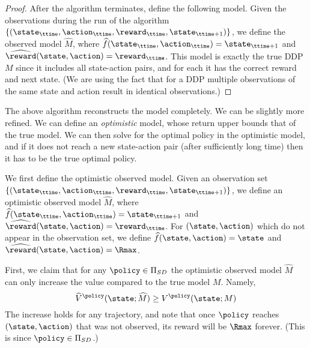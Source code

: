 \begin{proof}
After the algorithm terminates, define the following model. Given
the observations during the run of the algorithm
$\{(\state_\ttime,\action_\ttime ,\reward_\ttime,
\state_{\ttime+1})\}$, we define the observed model $\widehat{M}$,
where $\widehat{f}(\state_\ttime,\action_\ttime)=\state_{\ttime+1}$
and $\widehat{\reward}(\state,\action)=\reward_\ttime$. This model
is exactly the true DDP $M$ since it includes all state-action
pairs, and for each it has the correct reward and next state. (We
are using the fact that for a DDP multiple observations of the same
state and action result in identical observations.)
\end{proof}

The above algorithm reconstructs the model completely. We can be
slightly more refined. We can define an {\em optimistic} model, whose
return upper bounds that of the true model. We can then solve for
the optimal policy in the optimistic model, and if it does not reach a new state-action pair (after sufficiently long time) then it
has to be the true optimal policy.

We first define the optimistic observed model. Given an observation
set $\{(\state_\ttime,\action_\ttime ,\reward_\ttime,
\state_{\ttime+1})\}$, we define an optimistic observed model
$\widehat{M}$, where
$\widehat{f}(\state_\ttime,\action_\ttime)=\state_{\ttime+1}$ and
$\widehat{\reward}(\state,\action)=\reward_\ttime$.
%
For $(\state,\action)$ which do not appear in the observation set,
we define $\widehat{f}(\state,\action)=\state$ and
$\widehat{\reward}(\state,\action)=\Rmax$.

First, we claim that for any $\policy\in {\Pi _{SD}}$ the optimistic
observed model $\widehat{M}$ can only increase the value compared to
the true model $M$. Namely,
\[
\widehat{V}^\policy(\state;\widehat{M})\geq V^\policy(\state;M)
\]
The increase holds for any trajectory, and note that once $\policy$
reaches $(\state,\action)$ that was not observed, its reward will be
$\Rmax$ forever. (This is since $\policy\in {\Pi _{SD}}$.)

